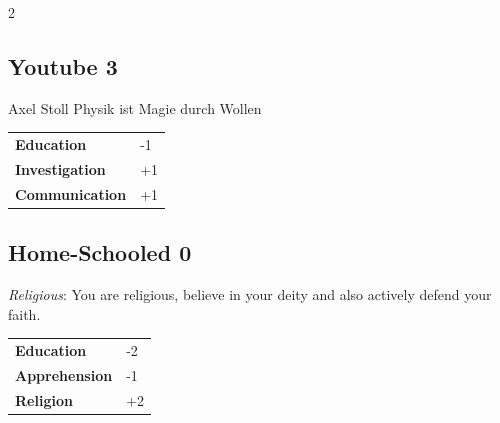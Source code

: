 \begin{multicols}{2}
\begin{tcolorbox}

\end{tcolorbox}

\begin{tcolorbox}
    \subsection*{Youtube \hfill \small{3 }}
    \tcblower


\begin{pquote}{Axel Stoll}
Physik ist Magie durch Wollen
\end{pquote}

\vspace{3mm}

\begin{tabular}{@{}ll@{}}
    \textbf{Education} & -1\\
    \textbf{Investigation} & +1\\
    \textbf{Communication} & +1\\
\end{tabular}


\end{tcolorbox}

\begin{tcolorbox}
    \subsection*{Home-Schooled \hfill \small{0 }}
    \tcblower
\textit{Religious}: You are religious, believe in your deity and also actively defend your faith.


\vspace{3mm}

\begin{tabular}{@{}ll@{}}
    \textbf{Education} & -2\\
    \textbf{Apprehension} & -1\\
    \textbf{Religion} & +2\\
\end{tabular}


\end{tcolorbox}
\end{multicols}
